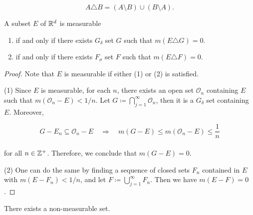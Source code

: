 \documentclass[12pt, a4paper, openany, twoside]{book}
\theoremstyle{definition}
\theoremstyle{remark}
\theoremstyle{plain}
\numberwithin{equation}{section}
\begin{document}
\[A\triangle B=(A\setminus B)\cup (B\setminus A).\]
\[\]
\begin{tcolorbox}[colback=yellow!10!white,colframe=red!75!black,title=Theorem 1.3.7]\label{Theorem 1.3.7}
    A subset $E$ of ${\mathbb {R}}^d$ is measurable 
    \begin{enumerate}
        \item [(1)] if and only if there exists $G_\delta$ set $G$ such that $m(E\triangle G)=0$.
        \item [(2)] if and only if there exists $F_\sigma$ set $F$ such that $m(E\triangle F)=0$.
    \end{enumerate}
\end{tcolorbox}
\begin{proof}
    Note that $E$ is measurable if either (1) or (2) is satisfied.

    \vspace{5mm}
    (1) Since $E$ is measurable, for each $n$, there exists an open set $\mathcal{O}_n$ containing $E$ such that $m(\mathcal{O}_n-E)<1/n$. Let $G\coloneqq\bigcap_{j=1}^{\infty}{\mathcal{O}_n}$, then it is a $G_\delta$ set containing $E$. Moreover, 

    \[G-E_n\subseteq \mathcal{O}_n-E\quad\Longrightarrow\quad m(G-E)\leq m(\mathcal{O}_n-E)\leq\frac{1}{n}\]
    \\
    for all $n\in{\mathbb {Z}}^+$. Therefore, we conclude that $m(G-E)=0$.
    
    \vspace{5mm}
    (2) One can do the same by finding a sequence of closed sets $F_n$ contained in $E$ with $m(E-F_n)<1/n$, and let $F\coloneqq\bigcup_{j=1}^{\infty}{F_n}$. Then we have $m(E-F)=0$.
\end{proof}
\vspace{5mm}
\begin{tcolorbox}[colback=yellow!10!white,colframe=red!75!black,title=Theorem 1.3.8]\label{Theorem 1.3.8}
    There exists a non-measurable set.
\end{tcolorbox}
\end{document}
